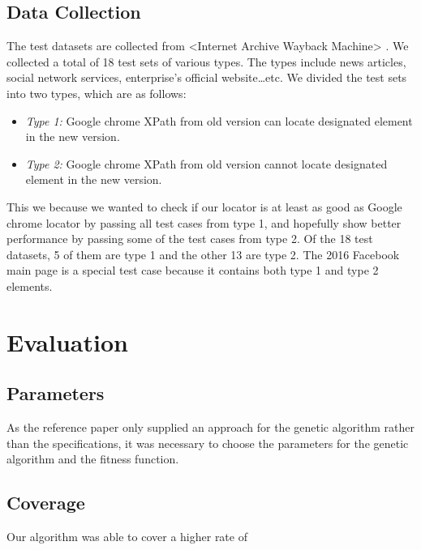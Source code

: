 \documentclass[format=acmlarge, nonacm=true]{acmart}
\begin{document}
\subsection{Data Collection}	
The test datasets are collected from <Internet Archive Wayback Machine> . We collected a total of 18 test sets of various types. The types include news articles, social network services, enterprise’s official website…etc. We divided the test sets into two types, which are as follows:
\begin{itemize}
	\item \emph{Type 1:} Google chrome XPath from old version can locate designated element in the new version.
	\item \emph{Type 2:} Google chrome XPath from old version cannot locate designated element in the new version.
\end{itemize}

This we because we wanted to check if our locator is at least as good as Google chrome locator by passing all test cases from type 1, and hopefully show better performance by passing some of the test cases from type 2. Of the 18 test datasets, 5 of them are type 1 and the other 13 are type 2. The 2016 Facebook main page is a special test case because it contains both type 1 and type 2 elements. 




\section{Evaluation}
\subsection{Parameters}
As the reference paper only supplied an approach for the genetic algorithm rather than the specifications, it was necessary to choose the parameters for the genetic algorithm and the fitness function. 

\subsection{Coverage}
Our algorithm was able to cover a higher rate of 
\end{document}
